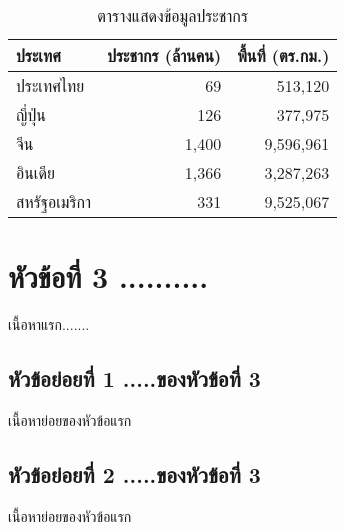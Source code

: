 \begin{table}[H]
\centering
\caption{ตารางแสดงข้อมูลประชากร}
\label{tab:population}
\begin{tabular}{lrr}
\toprule
\textbf{ประเทศ} & \textbf{ประชากร (ล้านคน)} & \textbf{พื้นที่ (ตร.กม.)} \\
\midrule
ประเทศไทย    & 69   & 513,120 \\
ญี่ปุ่น       & 126  & 377,975 \\
จีน           & 1,400 & 9,596,961 \\
อินเดีย       & 1,366 & 3,287,263 \\
สหรัฐอเมริกา  & 331  & 9,525,067 \\
\bottomrule
\end{tabular}
\end{table}

\section{หัวข้อที่ 3 ..........}
เนื้อหาแรก.......

\subsection{หัวข้อย่อยที่ 1 .....ของหัวข้อที่ 3}
เนื้อหาย่อยของหัวข้อแรก

\subsection{หัวข้อย่อยที่ 2 .....ของหัวข้อที่ 3}
เนื้อหาย่อยของหัวข้อแรก